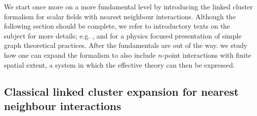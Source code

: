 We start once more on a more fundamental level by introducing the linked cluster
formalism for scalar fields with nearest neighbour interactions. Although the
following section should be complete, we refer to introductory texts
on the subject for more details; e.g. \citep{Wortis:1980zb,Reisz:1995ag}, and
\citep{Domb:1980zb,Martin:1980zb} for a physics focused presentation of simple
graph theoretical practices. After the fundamentals are out of the way. we study
how one can expand the formalism to also include $n$-point interactions with
finite spatial extent, a system in which the effective theory can then be
expressed.

\subsection{Classical linked cluster expansion for nearest neighbour interactions}
\label{sec:classical_lce_nn}

